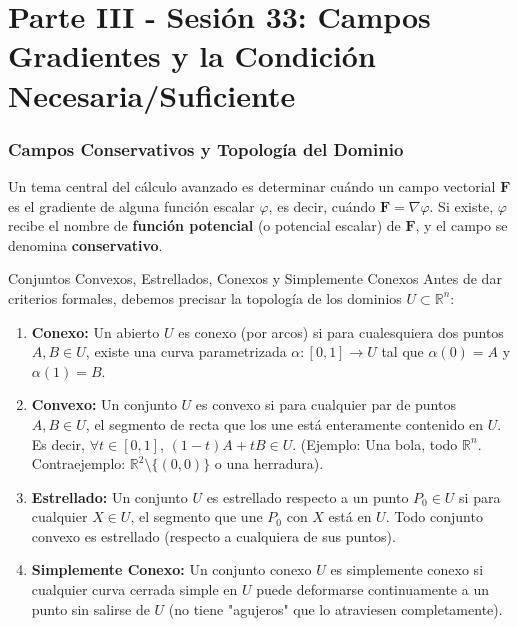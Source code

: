 \documentclass[11pt,a4paper]{article}
\begin{document}
\part*{Parte III - Sesión 33: Campos Gradientes y la Condición Necesaria/Suficiente}

\section{Campos Conservativos y Topología del Dominio}

Un tema central del cálculo avanzado es determinar cuándo un campo vectorial $\mathbf{F}$ es el gradiente de alguna función escalar $\varphi$, es decir, cuándo $\mathbf{F} = \nabla \varphi$. Si existe, $\varphi$ recibe el nombre de \textbf{función potencial} (o potencial escalar) de $\mathbf{F}$, y el campo se denomina \textbf{conservativo}.

\begin{definicionbox}{Conjuntos Convexos, Estrellados, Conexos y Simplemente Conexos}
Antes de dar criterios formales, debemos precisar la topología de los dominios $U \subset \mathbb{R}^n$:
\begin{enumerate}
    \item \textbf{Conexo:} Un abierto $U$ es conexo (por arcos) si para cualesquiera dos puntos $A, B \in U$, existe una curva parametrizada $\alpha: [0,1] \to U$ tal que $\alpha(0)=A$ y $\alpha(1)=B$.
    \item \textbf{Convexo:} Un conjunto $U$ es convexo si para cualquier par de puntos $A, B \in U$, el segmento de recta que los une está enteramente contenido en $U$. Es decir, $\forall t \in [0,1]$, $(1-t)A + tB \in U$. (Ejemplo: Una bola, todo $\mathbb{R}^n$. Contraejemplo: $\mathbb{R}^2 \setminus \{(0,0)\}$ o una herradura).
    \item \textbf{Estrellado:} Un conjunto $U$ es estrellado respecto a un punto $P_0 \in U$ si para cualquier $X \in U$, el segmento que une $P_0$ con $X$ está en $U$. Todo conjunto convexo es estrellado (respecto a cualquiera de sus puntos).
    \item \textbf{Simplemente Conexo:} Un conjunto conexo $U$ es simplemente conexo si cualquier curva cerrada simple en $U$ puede deformarse continuamente a un punto sin salirse de $U$ (no tiene "agujeros" que lo atraviesen completamente).
\end{enumerate}
\end{definicionbox}
\end{document}
